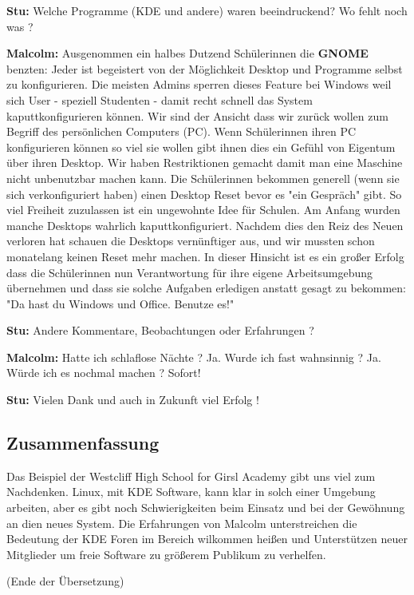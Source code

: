 \documentclass[10pt,a4paper,ngerman,twoside]{article} %
\begin{document}
\textbf{Stu:} Welche Programme (KDE und andere) waren beeindruckend? Wo fehlt noch was ?

\textbf{Malcolm:} Ausgenommen ein halbes Dutzend Schülerinnen die \textbf{GNOME} benzten: Jeder ist begeistert von der Möglichkeit Desktop und Programme selbst zu konfigurieren. Die meisten Admins sperren dieses Feature bei Windows weil sich User - speziell Studenten - damit recht schnell das System kaputtkonfigurieren können. Wir sind der Ansicht dass wir zurück wollen zum Begriff des persönlichen Computers (PC). Wenn Schülerinnen ihren PC konfigurieren können so viel sie wollen gibt ihnen dies ein Gefühl von Eigentum über ihren Desktop. Wir haben Restriktionen gemacht damit man eine Maschine nicht unbenutzbar machen kann. Die Schülerinnen bekommen generell (wenn sie sich verkonfiguriert haben) einen Desktop Reset bevor es "ein Gespräch" gibt. So viel Freiheit zuzulassen ist ein ungewohnte Idee für Schulen. Am Anfang wurden manche Desktops wahrlich kaputtkonfiguriert. Nachdem dies den Reiz des Neuen verloren hat schauen die Desktops vernünftiger aus, und wir mussten schon monatelang keinen Reset mehr machen. In dieser Hinsicht ist es ein großer Erfolg dass die Schülerinnen nun Verantwortung für ihre eigene Arbeitsumgebung übernehmen und dass sie solche Aufgaben erledigen anstatt gesagt zu bekommen: "Da hast du Windows und Office. Benutze es!"

\textbf{Stu:} Andere Kommentare, Beobachtungen oder Erfahrungen ? 

\textbf{Malcolm:} Hatte ich schlaflose Nächte ? Ja. Wurde ich fast wahnsinnig ? Ja. Würde ich es nochmal machen ? Sofort! 

\textbf{Stu:} Vielen Dank und auch in Zukunft viel Erfolg !



\subsection*{Zusammenfassung}

Das Beispiel der Westcliff High School for Girsl Academy gibt uns viel zum Nachdenken. Linux, mit KDE Software, kann klar in solch einer Umgebung arbeiten, aber es gibt noch Schwierigkeiten beim Einsatz und bei der Gewöhnung an dien neues System. Die Erfahrungen von Malcolm unterstreichen die Bedeutung der KDE Foren im Bereich wilkommen heißen und Unterstützen neuer Mitglieder um freie Software zu größerem Publikum zu verhelfen.

(Ende der Übersetzung)
\end{document}
